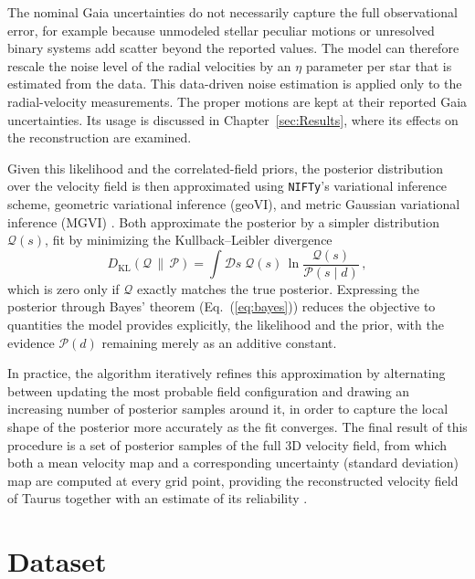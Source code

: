 The nominal
Gaia uncertainties do not necessarily capture the full observational error, for example
because unmodeled stellar peculiar motions or unresolved binary systems add scatter beyond the
reported values. The model can therefore rescale the noise level of the
radial velocities by an $\eta$ parameter per star that is estimated from the data.
This data-driven noise estimation is applied only to the radial-velocity measurements.
The proper motions are kept at their reported Gaia uncertainties.
Its usage is discussed in Chapter~\ref{sec:Results}, where its effects on the reconstruction are examined.

Given this likelihood and the correlated-field priors, the posterior distribution over the
velocity field is then approximated using \texttt{NIFTy}'s variational inference scheme,
geometric variational inference (geoVI), and metric Gaussian variational
inference (MGVI) \citep{Knollmueller2020,Frank2021}. Both approximate the posterior by a simpler
distribution $\mathcal{Q}(s)$, fit by minimizing the Kullback--Leibler divergence
\begin{equation}
    D_{\mathrm{KL}}(\mathcal{Q} \,\|\, \mathcal{P}) = \int \mathcal{D}s\; \mathcal{Q}(s)\,\ln\frac{\mathcal{Q}(s)}{\mathcal{P}(s\mid d)} \, ,
    \label{eq:kl}
\end{equation}
which is zero only if $\mathcal{Q}$ exactly matches the true posterior. Expressing the posterior
through Bayes' theorem (Eq.~(\ref{eq:bayes})) reduces the objective to quantities the model
provides explicitly, the likelihood and the prior, with the evidence $\mathcal{P}(d)$ remaining merely
as an additive constant.

In practice, the
algorithm iteratively refines this approximation by alternating between updating the most
probable field configuration and drawing an increasing number of posterior samples around
it, in order to capture the local shape of the posterior more accurately as the fit
converges. The final result of this procedure is a set of posterior samples of the full 3D
velocity field, from which both a mean velocity map and a corresponding uncertainty
(standard deviation) map are computed at every grid point, providing the reconstructed
velocity field of Taurus together with an estimate of its reliability
\citep{Knollmueller2020,Frank2021}.

\section{Dataset}
\label{sec:dataset}

